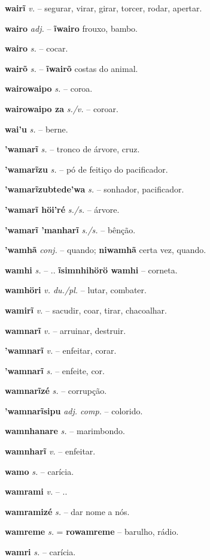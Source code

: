\textbf{wairĩ} \textit{v.} -- segurar, virar, girar, torcer, rodar, apertar.

\textbf{wairo} \textit{adj.} -- \textbf{ĩwairo} frouxo, bambo.

\textbf{wairo} \textit{s.} -- cocar.

\textbf{wairõ} \textit{s.} -- \textbf{ĩwairõ} costas do animal.

\textbf{wairowaipo} \textit{s.} -- coroa.

\textbf{wairowaipo za} \textit{s./v.} -- coroar.

\textbf{wai'u} \textit{s.} -- berne.

\textbf{'wamarĩ} \textit{s.} -- tronco de árvore, cruz.

\textbf{'wamarĩzu} \textit{s.} -- pó de feitiço do pacificador.

\textbf{'wamarĩzubtede'wa} \textit{s.} -- sonhador, pacificador.

\textbf{'wamarĩ höi'ré} \textit{s./s.} -- árvore.

\textbf{'wamarĩ 'manharĩ} \textit{s./s.} -- bênção.

\textbf{'wamhã} \textit{conj.} -- quando; \textbf{niwamhã} certa vez, quando.

\textbf{wamhi} \textit{s.} -- .. \textbf{ĩsimnhihörö wamhi} -- corneta.

\textbf{wamhöri} \textit{v. du./pl.} -- lutar, combater.

\textbf{wamirĩ} \textit{v.} -- sacudir, coar, tirar, chacoalhar.

\textbf{wamnarĩ} \textit{v.} -- arruinar, destruir.

\textbf{'wamnarĩ} \textit{v.} -- enfeitar, corar.

\textbf{'wamnarĩ} \textit{s.} -- enfeite, cor.

\textbf{wamnarĩzé} \textit{s.} -- corrupção.

\textbf{'wamnarĩsipu} \textit{adj. comp.} -- colorido.

\textbf{wamnhanare} \textit{s.} -- marimbondo.

\textbf{wamnharĩ} \textit{v.} -- enfeitar.

\textbf{wamo} \textit{s.} -- carícia.

\textbf{wamrami} \textit{v.} -- ..


\textbf{wamramizé} \textit{s.} -- dar nome a nós.

\textbf{wamreme} \textit{s.} = \textbf{rowamreme} -- barulho, rádio.

\textbf{wamri} \textit{s.} -- carícia.

